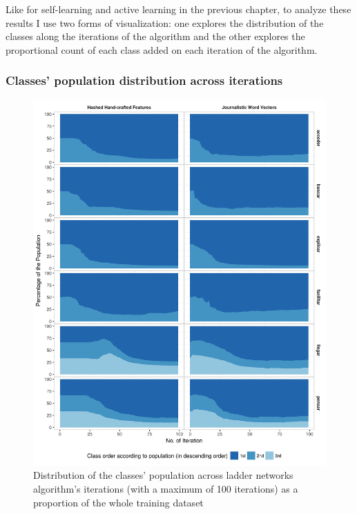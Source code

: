 Like for self-learning and active learning in the previous chapter, to analyze
these results I use two forms of visualization: one explores the distribution
of the classes along the iterations of the algorithm and the other explores the
proportional count of each class added on each iteration of the algorithm.

\subsubsection{Classes' population distribution across iterations}

\begin{figure}[htb!]
  \centering
  \includegraphics[height=0.9\textheight,width=\textwidth,keepaspectratio]
    {plots/ladder/population_distribution_100}
  \caption{Distribution of the classes' population across ladder networks
  algorithm's iterations (with a maximum of 100 iterations) as a proportion of
  the whole training dataset}
  \label{fig:ladder:population_distribution:100}
\end{figure}

